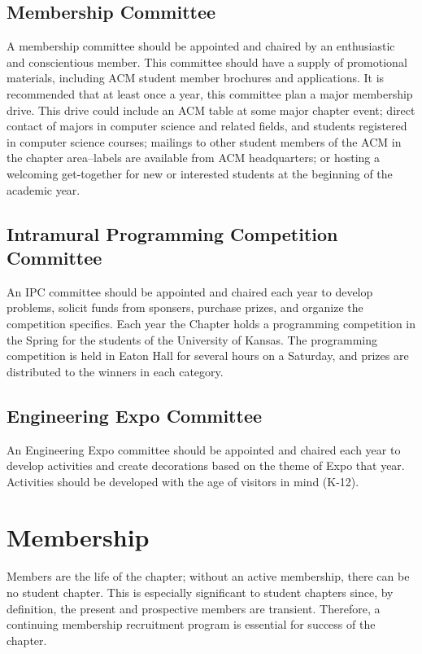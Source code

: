 \subsection*{Membership Committee}
A membership committee should be appointed and chaired by an enthusiastic and
conscientious member. This committee should have a supply of promotional
materials, including ACM student member brochures and applications. It is
recommended that at least once a year, this committee plan a major membership
drive. This drive could include an ACM table at some major chapter event; direct
contact of majors in computer science and related fields, and students registered
in computer science courses; mailings to other student members of the ACM in the
chapter area--labels are available from ACM headquarters; or hosting a welcoming
get-together for new or interested students at the beginning of the academic
year.

\subsection*{Intramural Programming Competition Committee}
An IPC committee should be appointed and chaired each year to develop problems,
solicit funds from sponsers, purchase prizes, and organize the competition
specifics. Each year the Chapter holds a programming competition in the Spring
for the students of the University of Kansas. The programming competition is
held in Eaton Hall for several hours on a Saturday, and prizes are distributed
to the winners in each category.

\subsection*{Engineering Expo Committee}
An Engineering Expo committee should be appointed and chaired each year to
develop activities and create decorations based on the theme of Expo that year.
Activities should be developed with the age of visitors in mind (K-12).

\section{Membership}

Members are the life of the chapter; without an active membership, there can be
no student chapter. This is especially significant to student chapters since, by
definition, the present and prospective members are transient. Therefore, a
continuing membership recruitment program is essential for success of the
chapter.

